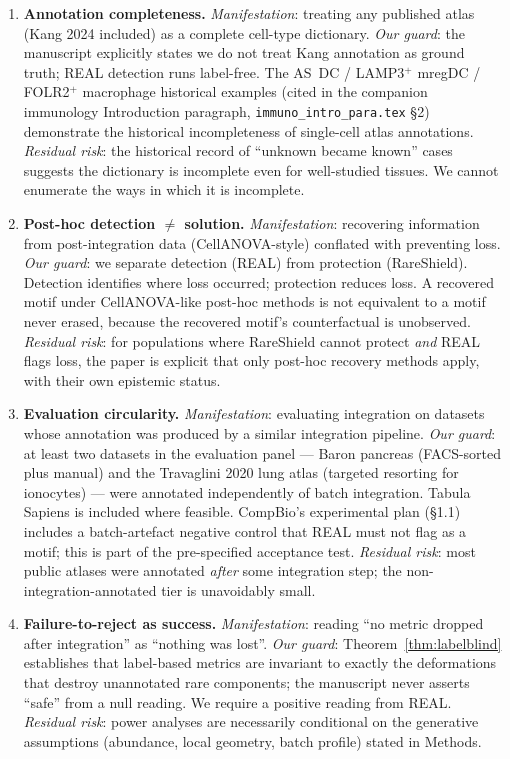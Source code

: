 \begin{enumerate}[label=\textbf{S0.\arabic*}, leftmargin=*]
\item \textbf{Annotation completeness.}
  \emph{Manifestation}: treating any published atlas (Kang 2024 included) as a complete cell-type dictionary.
  \emph{Our guard}: the manuscript explicitly states we do not treat Kang annotation as ground truth; REAL detection runs label-free. The AS~DC / LAMP3$^+$ mregDC / FOLR2$^+$ macrophage historical examples (cited in the companion immunology Introduction paragraph, \texttt{immuno\_intro\_para.tex} \S2) demonstrate the historical incompleteness of single-cell atlas annotations.
  \emph{Residual risk}: the historical record of ``unknown became known'' cases suggests the dictionary is incomplete even for well-studied tissues. We cannot enumerate the ways in which it is incomplete.

\item \textbf{Post-hoc detection $\neq$ solution.}
  \emph{Manifestation}: recovering information from post-integration data (CellANOVA-style) conflated with preventing loss.
  \emph{Our guard}: we separate detection (REAL) from protection (RareShield). Detection identifies where loss occurred; protection reduces loss. A recovered motif under CellANOVA-like post-hoc methods is not equivalent to a motif never erased, because the recovered motif's counterfactual is unobserved.
  \emph{Residual risk}: for populations where RareShield cannot protect \emph{and} REAL flags loss, the paper is explicit that only post-hoc recovery methods apply, with their own epistemic status.

\item \textbf{Evaluation circularity.}
  \emph{Manifestation}: evaluating integration on datasets whose annotation was produced by a similar integration pipeline.
  \emph{Our guard}: at least two datasets in the evaluation panel --- Baron pancreas (FACS-sorted plus manual) and the Travaglini 2020 lung atlas (targeted resorting for ionocytes) --- were annotated independently of batch integration. Tabula Sapiens is included where feasible. CompBio's experimental plan (\S1.1) includes a batch-artefact negative control that REAL must not flag as a motif; this is part of the pre-specified acceptance test.
  \emph{Residual risk}: most public atlases were annotated \emph{after} some integration step; the non-integration-annotated tier is unavoidably small.

\item \textbf{Failure-to-reject as success.}
  \emph{Manifestation}: reading ``no metric dropped after integration'' as ``nothing was lost''.
  \emph{Our guard}: Theorem~\ref{thm:labelblind} establishes that label-based metrics are invariant to exactly the deformations that destroy unannotated rare components; the manuscript never asserts ``safe'' from a null reading. We require a positive reading from REAL.
  \emph{Residual risk}: power analyses are necessarily conditional on the generative assumptions (abundance, local geometry, batch profile) stated in Methods.

\end{enumerate}

